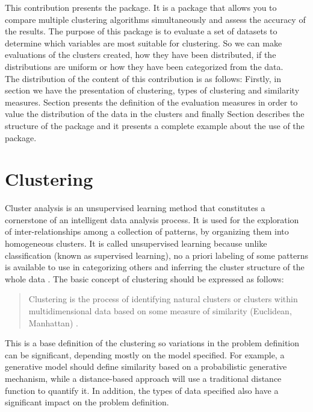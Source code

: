 This contribution presents the  package. It is a package that allows you to compare multiple clustering algorithms simultaneously and assess the accuracy of the results. The purpose of this package is to evaluate a set of datasets to determine which variables are most suitable for clustering. So we can make evaluations of the clusters created, how they have been distributed, if the distributions are uniform or how they have been categorized from the data.\\
The distribution of the content of this contribution is as follows: Firstly, in section  we have the  presentation of clustering, types of clustering and similarity measures. Section  presents the definition of the evaluation measures in order to value the distribution of the data in the clusters and finally Section  describes the structure of the package and it presents a complete example about the use of the package.

\section{Clustering} \label{sec:seccion1}

Cluster analysis is an unsupervised learning method that constitutes a cornerstone of an intelligent data analysis process. It is used for the exploration of inter-relationships among a collection of patterns, by organizing them into homogeneous clusters. It is called unsupervised learning because unlike classification (known as supervised learning), no a priori labeling of some patterns is available to use in categorizing others and inferring the cluster structure of the whole data \citep{b17}. The basic concept of clustering should be expressed as follows:
\\
\begin{quote}
Clustering is the process of identifying natural clusters or clusters within multidimensional data based on some measure of similarity (Euclidean, Manhattan) \citep{b18}.
\end{quote}


This is a base definition of the clustering so variations in the problem definition can be significant, depending mostly on the model specified. For example, a generative model should define similarity based on a probabilistic generative mechanism, while a distance-based approach will use a traditional distance function to quantify it. In addition, the types of data specified also have a significant impact on the problem definition.

